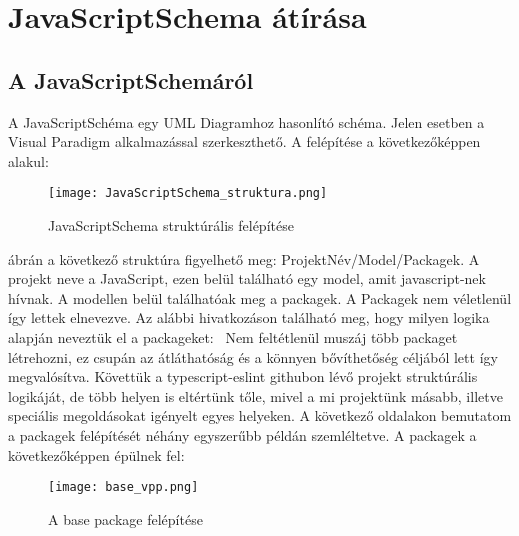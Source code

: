 \chapter{JavaScriptSchema átírása}\label{chap:JavaScriptSchema átírása}

\section{A JavaScriptSchemáról}

\noindent

A JavaScriptSchéma egy UML Diagramhoz hasonlító schéma. Jelen esetben a Visual Paradigm alkalmazással szerkeszthető.
A felépítése a következőképpen alakul:

\begin{figure}[!htbp]
      \caption{JavaScriptSchema struktúrális felépítése}\label{fig:JavaScriptSchema_struktura}
      \centering
      \texttt{[image: JavaScriptSchema\_struktura.png]}
\end{figure}

 ábrán a következő struktúra figyelhető meg: ProjektNév/Model/Packagek.
A projekt neve a JavaScript, ezen belül található egy model, amit javascript-nek hívnak. A modellen belül találhatóak meg a packagek.
A Packagek nem véletlenül így lettek elnevezve. Az alábbi hivatkozáson található meg, hogy milyen logika alapján neveztük el a packageket:~\cite{typescript-eslint}
Nem feltétlenül muszáj több packaget létrehozni, ez csupán az átláthatóság és a könnyen bővíthetőség céljából lett így megvalósítva.
Követtük a typescript-eslint githubon lévő projekt struktúrális logikáját, de több helyen is eltértünk tőle, mivel a mi projektünk másabb, illetve speciális megoldásokat igényelt egyes helyeken.
A következő oldalakon bemutatom a packagek felépítését néhány egyszerűbb példán szemléltetve.
A packagek a következőképpen épülnek fel:
\begin{figure}[!htbp]
      \caption{A base package felépítése}\label{fig:base_vpp}
      \centering
      \texttt{[image: base\_vpp.png]}
\end{figure}

